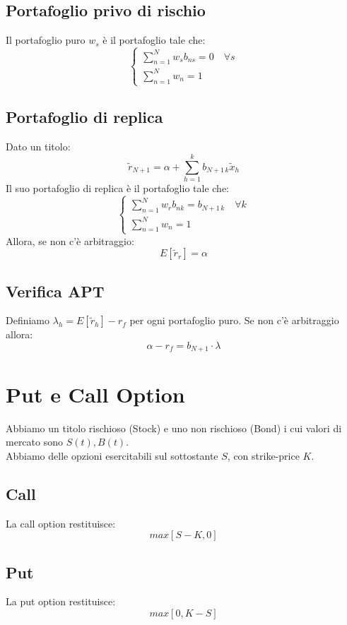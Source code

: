 \documentclass[a4paper,notitlepage]{report}%
\begin{document}
\begin{multicols*}{2}
    \subsection*{Portafoglio privo di rischio}
    Il portafoglio puro $w_s$ è il portafoglio tale che:
    \[
        \left\{\begin{array}{l}
            \sum_{n=1}^N w_s b_{ns} = 0 \quad \forall s \\
            \sum_{n=1}^N w_n  = 1
        \end{array}\right.  
    \]

    \subsection*{Portafoglio di replica}
    Dato un titolo:
    \[
        \tilde{r}_{N+1} = \alpha + \sum_{h=1}^k b_{N+1 \, k}\tilde{x}_h
    \]
    Il suo portafoglio di replica è il portafoglio tale che:
    \[
        \left\{\begin{array}{l}
            \sum_{n=1}^N w_r b_{nk} = b_{N+1 \, k} \quad \forall k\\
            \sum_{n=1}^N w_n  = 1
        \end{array}\right.  
    \]
    Allora, se non c'è arbitraggio:
    \[
        E[\tilde{r}_r] = \alpha    
    \]

    \subsection*{Verifica APT}
    Definiamo $\lambda_h = E[\tilde{r}_h]-r_f$ per ogni portafoglio puro.
    Se non c'è arbitraggio allora:
    \[
        \alpha-r_f = b_{N+1} \cdot \lambda    
    \]


\section*{Put e Call Option}
    Abbiamo un titolo rischioso (Stock) e uno non rischioso (Bond)
    i cui valori di mercato sono $S(t), B(t)$. \\
    Abbiamo delle opzioni esercitabili sul sottostante $S$,
    con strike-price $K$.
    \subsection*{Call}
    La call option restituisce:
    \[
        max[S-K,0]
    \]
    \subsection*{Put}
    La put option restituisce:
    \[
        max[0,K-S]
    \]


\end{multicols*}
\end{document}
